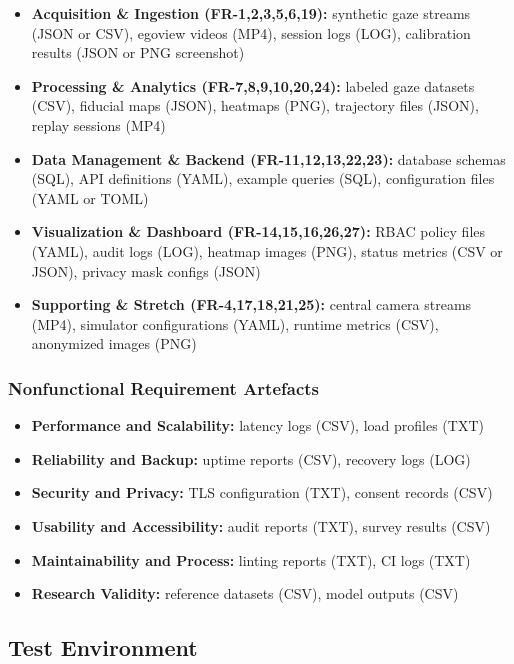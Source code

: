 \documentclass[12pt, titlepage]{article}
\begin{document}
\begin{itemize}
  \item \textbf{Acquisition \& Ingestion (FR-1,2,3,5,6,19):} synthetic gaze streams (JSON or CSV), egoview videos (MP4), session logs (LOG), calibration results (JSON or PNG screenshot)
  \item \textbf{Processing \& Analytics (FR-7,8,9,10,20,24):} labeled gaze datasets (CSV), fiducial maps (JSON), heatmaps (PNG), trajectory files (JSON), replay sessions (MP4)
  \item \textbf{Data Management \& Backend (FR-11,12,13,22,23):} database schemas (SQL), API definitions (YAML), example queries (SQL), configuration files (YAML or TOML)
  \item \textbf{Visualization \& Dashboard (FR-14,15,16,26,27):} RBAC policy files (YAML), audit logs (LOG), heatmap images (PNG), status metrics (CSV or JSON), privacy mask configs (JSON)
  \item \textbf{Supporting \& Stretch (FR-4,17,18,21,25):} central camera streams (MP4), simulator configurations (YAML), runtime metrics (CSV), anonymized images (PNG)
\end{itemize}

\subsubsection*{Nonfunctional Requirement Artefacts}

\begin{itemize}
  \item \textbf{Performance and Scalability:} latency logs (CSV), load profiles (TXT)
  \item \textbf{Reliability and Backup:} uptime reports (CSV), recovery logs (LOG)
  \item \textbf{Security and Privacy:} TLS configuration (TXT), consent records (CSV)
  \item \textbf{Usability and Accessibility:} audit reports (TXT), survey results (CSV)
  \item \textbf{Maintainability and Process:} linting reports (TXT), CI logs (TXT)
  \item \textbf{Research Validity:} reference datasets (CSV), model outputs (CSV)
\end{itemize}

\subsection{Test Environment}
\end{document}
